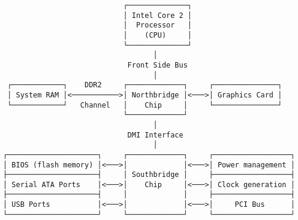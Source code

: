 \documentclass[varwidth=41em,crop]{standalone}
\begin{document}
\begin{verbatim}
                            ┌──────────────┐
                            │ Intel Core 2 │
                            │  Processor   │
                            │    (CPU)     │
                            └──────────────┘
                                   │
                             Front Side Bus
                                   │
 ┌────────────┐    DDR2     ┌─────────────┐     ┌───────────────┐
 │ System RAM │<───────────>│ Northbridge │<───>│ Graphics Card │
 └────────────┘   Channel   │    Chip     │     └───────────────┘
                            └─────────────┘
                                   │
                             DMI Interface
                                   │
┌─────────────────────┐     ┌─────────────┐     ┌──────────────────┐
│ BIOS (flash memory) │<───>│             │<───>│ Power management │
├─────────────────────┤     │ Southbridge │     ├──────────────────┤
│ Serial ATA Ports    │<───>│    Chip     │<───>│ Clock generation │
├─────────────────────┤     │             │     ├──────────────────┤
│ USB Ports           │<───>│             │<───>│     PCI Bus      │
└─────────────────────┘     └─────────────┘     └──────────────────┘
\end{verbatim}
\end{document}
